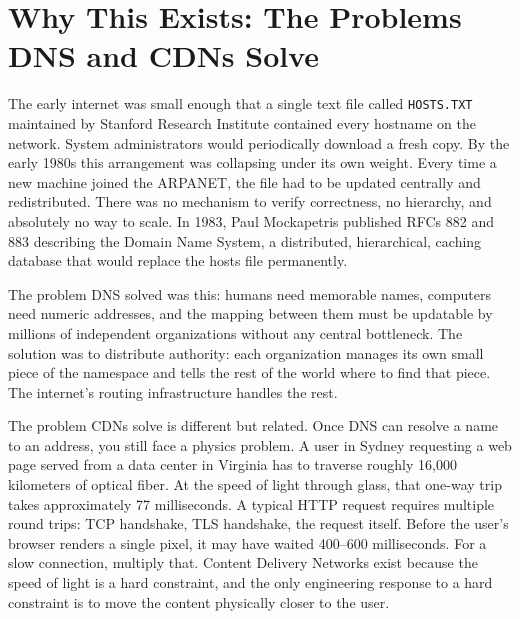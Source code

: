\documentclass[11pt,a4paper]{article}
\begin{document}
\tableofcontents
\newpage

\section{Why This Exists: The Problems DNS and CDNs Solve}

The early internet was small enough that a single text file called \texttt{HOSTS.TXT} maintained by Stanford Research Institute contained every hostname on the network. System administrators would periodically download a fresh copy. By the early 1980s this arrangement was collapsing under its own weight. Every time a new machine joined the ARPANET, the file had to be updated centrally and redistributed. There was no mechanism to verify correctness, no hierarchy, and absolutely no way to scale. In 1983, Paul Mockapetris published RFCs 882 and 883 describing the Domain Name System, a distributed, hierarchical, caching database that would replace the hosts file permanently.

The problem DNS solved was this: humans need memorable names, computers need numeric addresses, and the mapping between them must be updatable by millions of independent organizations without any central bottleneck. The solution was to distribute authority: each organization manages its own small piece of the namespace and tells the rest of the world where to find that piece. The internet's routing infrastructure handles the rest.

The problem CDNs solve is different but related. Once DNS can resolve a name to an address, you still face a physics problem. A user in Sydney requesting a web page served from a data center in Virginia has to traverse roughly 16,000 kilometers of optical fiber. At the speed of light through glass, that one-way trip takes approximately 77 milliseconds. A typical HTTP request requires multiple round trips: TCP handshake, TLS handshake, the request itself. Before the user's browser renders a single pixel, it may have waited 400--600 milliseconds. For a slow connection, multiply that. Content Delivery Networks exist because the speed of light is a hard constraint, and the only engineering response to a hard constraint is to move the content physically closer to the user.

\end{document}
